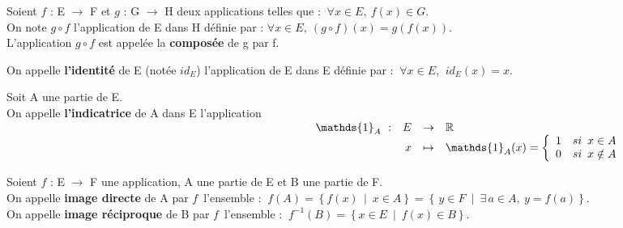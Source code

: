 Soient \(f\) : E \(\to\) F et \(g\) : G \(\to\) H deux applications telles que : \(\ \forall x\in E,\ f(x)\in G \). \\
On note \(g\circ f\) l'application de E dans H définie par : \(\forall x\in E,\ (g\circ f)(x)=g(f(x)). \)\\
L'application \(g\circ f\) est appelée la \textbf{composée} de g par f.

\vspace{1cm}

\noindent On appelle \textbf{l'identité} de E (notée $id_E$) l'application de E dans E définie par : \(\ \forall x\in E,\ \,id_E(x)=x. \)

\vspace{1cm}

Soit A une partie de E.\\
On appelle \textbf{l'indicatrice} de A dans E l'application \vspace{-0.46cm} \\
\( 
\begin{array}{rrcl}
    \hspace{9.4cm} \mathds{1}_A\ : & E & \to & \RR  \\
                               & x & \mapsto & \mathds{1}_A(x)= \left\{ \begin{array}{ll}
                                                                            1 & si\ \,x\in A \\
                                                                            0 & si\ \,x\notin A
                                                                         \end{array} \right.
\end{array}
\)



\vspace{1cm}

Soient \(f\) : E \(\to\) F une application, A une partie de E et B une partie de F.\vspace{0.1cm} \\ 
On appelle \textbf{image directe} de A par \(f\,\) l'ensemble : \(\ f(A)=\left\{f(x)\, \mid \ x\in A\right\} = \left\{ \,y\in F\: \mid \: \exists \, a\in A,\ y=f(a)\right\}\).\vspace{0.1cm} \\ 
On appelle \textbf{image réciproque} de B par \(f\,\) l'ensemble : \(\ f^{-1}(B)=\left\{x\in E \ \mid \ f(x)\in B \right\}\).

